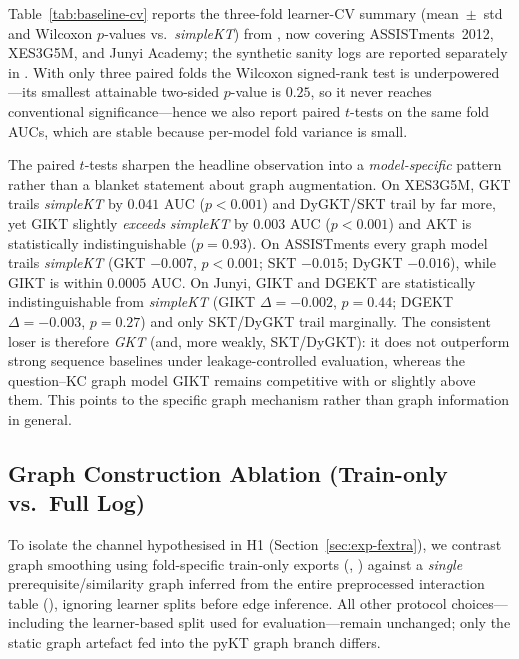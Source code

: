 \documentclass[runningheads]{llncs}
\begin{document}

Table~\ref{tab:baseline-cv} reports the three-fold learner-CV summary
(mean~$\pm$~std and Wilcoxon $p$-values vs.\ \textit{simpleKT}) from
, now covering ASSISTments~2012,
XES3G5M, and Junyi Academy; the synthetic sanity logs are reported
separately in . With only three
paired folds the Wilcoxon signed-rank test is underpowered---its smallest
attainable two-sided $p$-value is $0.25$, so it never reaches conventional
significance---hence we also report paired $t$-tests on the same fold AUCs,
which are stable because per-model fold variance is small.

The paired $t$-tests sharpen the headline observation into a
\emph{model-specific} pattern rather than a blanket statement about graph
augmentation. On XES3G5M, GKT trails \textit{simpleKT} by $0.041$ AUC
($p{<}0.001$) and DyGKT/SKT trail by far more, yet GIKT slightly
\emph{exceeds} \textit{simpleKT} by $0.003$ AUC ($p{<}0.001$) and AKT is
statistically indistinguishable ($p{=}0.93$). On ASSISTments every graph
model trails \textit{simpleKT} (GKT $-0.007$, $p{<}0.001$; SKT $-0.015$;
DyGKT $-0.016$), while GIKT is within $0.0005$ AUC. On Junyi, GIKT and DGEKT
are statistically indistinguishable from \textit{simpleKT} (GIKT
$\Delta{=}-0.002$, $p{=}0.44$; DGEKT $\Delta{=}-0.003$, $p{=}0.27$) and only
SKT/DyGKT trail marginally. The consistent loser is therefore \emph{GKT}
(and, more weakly, SKT/DyGKT): it does not outperform strong sequence
baselines under leakage-controlled evaluation, whereas the question--KC graph
model GIKT remains competitive with or slightly above them. This points to
the specific graph mechanism rather than graph information in general.

\subsection{Graph Construction Ablation (Train-only vs.\ Full Log)}
\label{sec:exp-graph-ablation}
To isolate the channel hypothesised in H1 (Section~\ref{sec:exp-fextra}),
we contrast graph smoothing using fold-specific train-only exports
(, ) against a
\emph{single} prerequisite/similarity graph inferred from the entire
preprocessed interaction table (),
ignoring learner splits before edge inference.
All other protocol choices---including the learner-based split used for
evaluation---remain unchanged; only the static graph artefact fed into the
pyKT graph branch differs.
\end{document}
